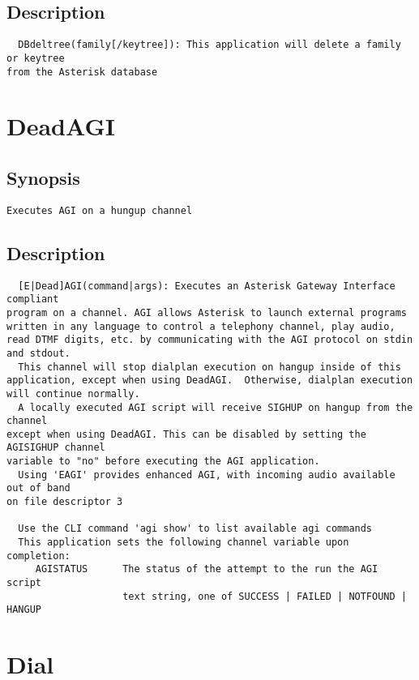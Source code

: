 \subsection{Description}
\begin{verbatim}
  DBdeltree(family[/keytree]): This application will delete a family or keytree
from the Asterisk database

\end{verbatim}


\section{DeadAGI}
\subsection{Synopsis}
\begin{verbatim}
Executes AGI on a hungup channel
\end{verbatim}
\subsection{Description}
\begin{verbatim}
  [E|Dead]AGI(command|args): Executes an Asterisk Gateway Interface compliant
program on a channel. AGI allows Asterisk to launch external programs
written in any language to control a telephony channel, play audio,
read DTMF digits, etc. by communicating with the AGI protocol on stdin
and stdout.
  This channel will stop dialplan execution on hangup inside of this
application, except when using DeadAGI.  Otherwise, dialplan execution
will continue normally.
  A locally executed AGI script will receive SIGHUP on hangup from the channel
except when using DeadAGI. This can be disabled by setting the AGISIGHUP channel
variable to "no" before executing the AGI application.
  Using 'EAGI' provides enhanced AGI, with incoming audio available out of band
on file descriptor 3

  Use the CLI command 'agi show' to list available agi commands
  This application sets the following channel variable upon completion:
     AGISTATUS      The status of the attempt to the run the AGI script
                    text string, one of SUCCESS | FAILED | NOTFOUND | HANGUP

\end{verbatim}


\section{Dial}
